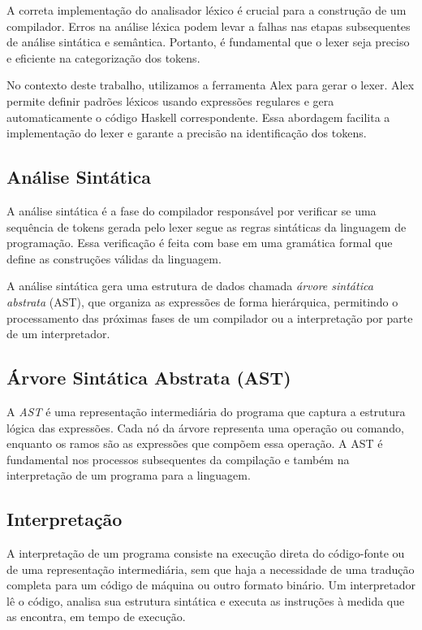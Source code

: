 \documentclass{article}
\begin{document}
A correta implementação do analisador léxico é crucial para a construção de um compilador. Erros na análise léxica podem levar a falhas nas etapas subsequentes de análise sintática e semântica. Portanto, é fundamental que o lexer seja preciso e eficiente na categorização dos tokens.

No contexto deste trabalho, utilizamos a ferramenta Alex para gerar o lexer. Alex permite definir padrões léxicos usando expressões regulares e gera automaticamente o código Haskell correspondente. Essa abordagem facilita a implementação do lexer e garante a precisão na identificação dos tokens.

\subsection{Análise Sintática}
A análise sintática é a fase do compilador responsável por verificar se uma sequência de tokens gerada pelo lexer segue as regras sintáticas da linguagem de programação. Essa verificação é feita com base em uma gramática formal que define as construções válidas da linguagem.

A análise sintática gera uma estrutura de dados chamada \textit{árvore sintática abstrata} (AST), que organiza as expressões de forma hierárquica, permitindo o processamento das próximas fases de um compilador ou a interpretação por parte de um interpretador.

\subsection{Árvore Sintática Abstrata (AST)}
A \textit{AST} é uma representação intermediária do programa que captura a estrutura lógica das expressões. Cada nó da árvore representa uma operação ou comando, enquanto os ramos são as expressões que compõem essa operação. A AST é fundamental nos processos subsequentes da compilação e também na interpretação de um programa para a linguagem.

\subsection{Interpretação}
A interpretação de um programa consiste na execução direta do código-fonte ou de uma representação intermediária, sem que haja a necessidade de uma tradução completa para um código de máquina ou outro formato binário. Um interpretador lê o código, analisa sua estrutura sintática e executa as instruções à medida que as encontra, em tempo de execução.
\end{document}
